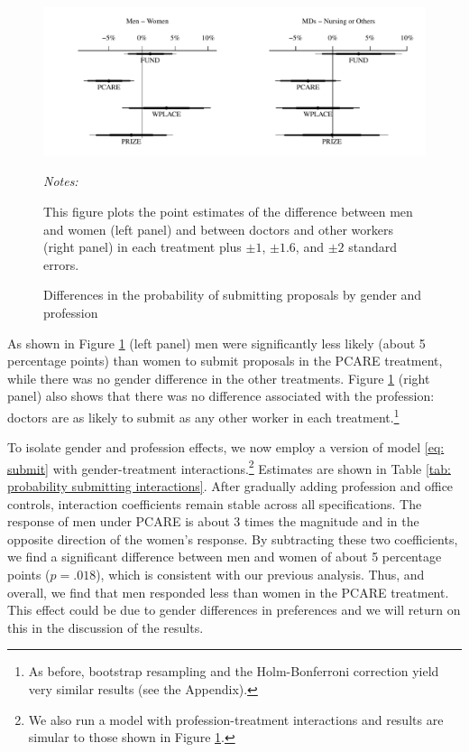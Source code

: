\documentclass[12pt, titlepage]{article}
\newenvironment{tablenotes}[1][]{
  \begin{minipage}{\textwidth}\emph{Notes:}{\footnotesize #1}
}{\end{minipage}}
\begin{document}
\begin{figure} 
  \centering
  \caption{Differences in the probability of submitting proposals by gender and profession}
  \label{fig: interactions}
  \includegraphics{Figures/plot-gender-1.pdf}
  \begin{tablenotes}
  This figure plots the point estimates of the difference between men and women (left panel) and between doctors and other workers (right panel) in each treatment plus $\pm 1$, $\pm 1.6$, and $\pm 2$ standard errors.%
  \end{tablenotes}
\end{figure}

As shown in Figure \ref{fig: interactions} (left panel) men were
significantly less likely (about 5 percentage points) than women to
submit proposals in the PCARE treatment, while there was no gender
difference in the other treatments. Figure \ref{fig: interactions}
(right panel) also shows that there was no difference associated with
the profession: doctors are as likely to submit as any other worker in
each treatment.\footnote{As before, bootstrap resampling and the
  Holm-Bonferroni correction yield very similar results (see the
  Appendix).}

To isolate gender and profession effects, we now employ a version of
model \eqref{eq: submit} with gender-treatment interactions.\footnote{We
  also run a model with profession-treatment interactions and results
  are simular to those shown in Figure \ref{fig: interactions}.}
Estimates are shown in Table
\ref{tab: probability submitting interactions}. After gradually adding
profession and office controls, interaction coefficients remain stable
across all specifications. The response of men under PCARE is about 3
times the magnitude and in the opposite direction of the women's
response. By subtracting these two coefficients, we find a significant
difference between men and women of about 5 percentage points
(\(p=.018\)), which is consistent with our previous analysis. Thus, and
overall, we find that men responded less than women in the PCARE
treatment. This effect could be due to gender differences in preferences
and we will return on this in the discussion of the results.
\end{document}
